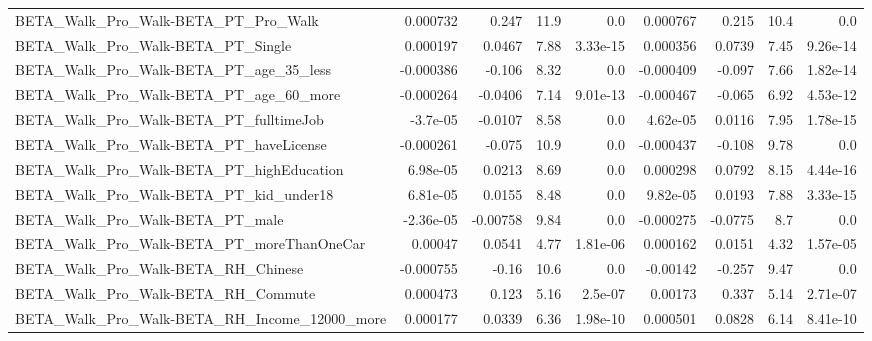 \begin{tabular}{lrrrrrrrr}
BETA\_Walk\_Pro\_Walk-BETA\_PT\_Pro\_Walk                &    0.000732 &        0.247 &      11.9 &      0.0 &   0.000767 &       0.215 &         10.4 &           0.0 \\
BETA\_Walk\_Pro\_Walk-BETA\_PT\_Single                  &    0.000197 &       0.0467 &      7.88 & 3.33e-15 &   0.000356 &      0.0739 &         7.45 &      9.26e-14 \\
BETA\_Walk\_Pro\_Walk-BETA\_PT\_age\_35\_less             &   -0.000386 &       -0.106 &      8.32 &      0.0 &  -0.000409 &      -0.097 &         7.66 &      1.82e-14 \\
BETA\_Walk\_Pro\_Walk-BETA\_PT\_age\_60\_more             &   -0.000264 &      -0.0406 &      7.14 & 9.01e-13 &  -0.000467 &      -0.065 &         6.92 &      4.53e-12 \\
BETA\_Walk\_Pro\_Walk-BETA\_PT\_fulltimeJob             &    -3.7e-05 &      -0.0107 &      8.58 &      0.0 &   4.62e-05 &      0.0116 &         7.95 &      1.78e-15 \\
BETA\_Walk\_Pro\_Walk-BETA\_PT\_haveLicense             &   -0.000261 &       -0.075 &      10.9 &      0.0 &  -0.000437 &      -0.108 &         9.78 &           0.0 \\
BETA\_Walk\_Pro\_Walk-BETA\_PT\_highEducation           &    6.98e-05 &       0.0213 &      8.69 &      0.0 &   0.000298 &      0.0792 &         8.15 &      4.44e-16 \\
BETA\_Walk\_Pro\_Walk-BETA\_PT\_kid\_under18             &    6.81e-05 &       0.0155 &      8.48 &      0.0 &   9.82e-05 &      0.0193 &         7.88 &      3.33e-15 \\
BETA\_Walk\_Pro\_Walk-BETA\_PT\_male                    &   -2.36e-05 &     -0.00758 &      9.84 &      0.0 &  -0.000275 &     -0.0775 &          8.7 &           0.0 \\
BETA\_Walk\_Pro\_Walk-BETA\_PT\_moreThanOneCar          &     0.00047 &       0.0541 &      4.77 & 1.81e-06 &   0.000162 &      0.0151 &         4.32 &      1.57e-05 \\
BETA\_Walk\_Pro\_Walk-BETA\_RH\_Chinese                 &   -0.000755 &        -0.16 &      10.6 &      0.0 &   -0.00142 &      -0.257 &         9.47 &           0.0 \\
BETA\_Walk\_Pro\_Walk-BETA\_RH\_Commute                 &    0.000473 &        0.123 &      5.16 &  2.5e-07 &    0.00173 &       0.337 &         5.14 &      2.71e-07 \\
BETA\_Walk\_Pro\_Walk-BETA\_RH\_Income\_12000\_more       &    0.000177 &       0.0339 &      6.36 & 1.98e-10 &   0.000501 &      0.0828 &         6.14 &      8.41e-10 \\

\end{tabular}
